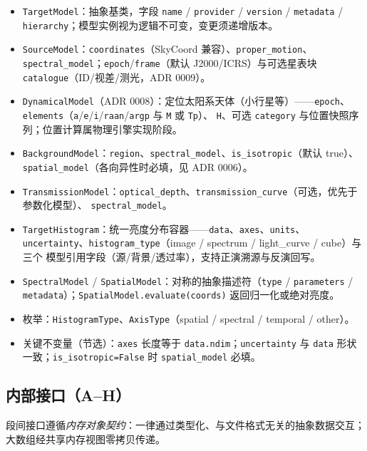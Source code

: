 \begin{itemize}
  \item \texttt{TargetModel}：抽象基类，字段 \texttt{name} / \texttt{provider} / \texttt{version} /
        \texttt{metadata} / \texttt{hierarchy}；模型实例视为逻辑不可变，变更须递增版本。
  \item \texttt{SourceModel}：\texttt{coordinates}（SkyCoord 兼容）、\texttt{proper\_motion}、
        \texttt{spectral\_model}；\texttt{epoch}/\texttt{frame}（默认 J2000/ICRS）与可选星表块
        \texttt{catalogue}（ID/视差/测光，ADR 0009）。
  \item \texttt{DynamicalModel}（ADR 0008）：定位太阳系天体（小行星等）——\texttt{epoch}、
        \texttt{elements}（\texttt{a}/\texttt{e}/\texttt{i}/\texttt{raan}/\texttt{argp} 与 \texttt{M} 或 \texttt{Tp}）、
        \texttt{H}、可选 \texttt{category} 与位置快照序列；位置计算属物理引擎实现阶段。
  \item \texttt{BackgroundModel}：\texttt{region}、\texttt{spectral\_model}、\texttt{is\_isotropic}（默认 true）、
        \texttt{spatial\_model}（各向异性时必填，见 ADR 0006）。
  \item \texttt{TransmissionModel}：\texttt{optical\_depth}、\texttt{transmission\_curve}（可选，优先于参数化模型）、
        \texttt{spectral\_model}。
  \item \texttt{TargetHistogram}：统一亮度分布容器——\texttt{data}、\texttt{axes}、\texttt{units}、
        \texttt{uncertainty}、\texttt{histogram\_type}（image / spectrum / light\_curve / cube）与三个
        模型引用字段（源/背景/透过率），支持正演溯源与反演回写。
  \item \texttt{SpectralModel} / \texttt{SpatialModel}：对称的抽象描述符（\texttt{type} / \texttt{parameters} /
        \texttt{metadata}）；\texttt{SpatialModel.evaluate(coords)} 返回归一化或绝对亮度。
  \item 枚举：\texttt{HistogramType}、\texttt{AxisType}（spatial / spectral / temporal / other）。
  \item 关键不变量（节选）：\texttt{axes} 长度等于 \texttt{data.ndim}；\texttt{uncertainty} 与 \texttt{data}
        形状一致；\texttt{is\_isotropic=False} 时 \texttt{spatial\_model} 必填。
\end{itemize}

\subsection{内部接口（A--H）}
\label{sec:icd-internal}

段间接口遵循\emph{内存对象契约}：一律通过类型化、与文件格式无关的抽象数据交互；大数组经共享内存视图零拷贝传递。

